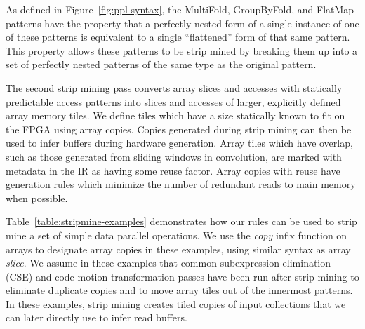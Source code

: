 As defined in Figure~\ref{fig:ppl-syntax}, the MultiFold, GroupByFold, and FlatMap patterns have the property that a perfectly nested form of a single instance of one of these
patterns is equivalent to a single ``flattened'' form of that same pattern. This property allows these patterns to be strip mined by
breaking them up into a set of perfectly nested patterns of the same type as the original pattern.

The second strip mining pass converts array slices and accesses with statically predictable access patterns into slices and accesses of larger, explicitly defined
array memory tiles. We define tiles which have a size statically known to fit on the FPGA using array copies.
Copies generated during strip mining can then be used to infer buffers during hardware generation.
Array tiles which have overlap, such as those generated from sliding windows in convolution, are marked with metadata in the IR as having some reuse factor.
Array copies with reuse have generation rules which minimize the number of redundant reads to main memory when possible.



Table~\ref{table:stripmine-examples} demonstrates how our rules can be used to strip mine a set of simple data parallel operations.
We use the \emph{copy} infix function on arrays to designate array copies in these examples, using similar syntax as array \emph{slice}.
We assume in these examples that common subexpression elimination (CSE) and code motion transformation passes have been run after strip mining to eliminate duplicate copies and to
move array tiles out of the innermost patterns. In these examples, strip mining creates tiled copies of input collections that
we can later directly use to infer read buffers.

